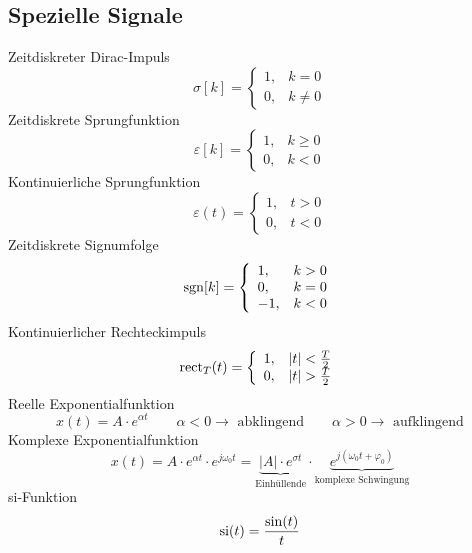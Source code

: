 \documentclass[a4paper, 10pt, fleqn]{article}
\begin{document}
\subsection{Spezielle Signale}
Zeitdiskreter Dirac-Impuls
\[
\sigma[k] = \left\{
    \begin{array}{ll}
        1, & k = 0 \\
        0, & k \neq 0
    \end{array}
\right.
\]
Zeitdiskrete Sprungfunktion
\[
\varepsilon[k] = \left\{
    \begin{array}{ll}
        1, & k \geq 0 \\
        0, & k < 0
    \end{array}
\right.
\]
Kontinuierliche Sprungfunktion
\[
\varepsilon(t) = \left\{
    \begin{array}{ll}
        1, & t > 0 \\
        0, & t < 0
    \end{array}
\right.
\]
Zeitdiskrete Signumfolge
\[
\operatorname{sgn}[k] = \left\{
    \begin{array}{ll}
        1,  & k > 0 \\
        0,  & k = 0 \\
        -1, & k < 0
    \end{array}
\right.
\]
Kontinuierlicher Rechteckimpuls
\[
\operatorname{rect}_T(t) = \left\{
    \begin{array}{ll}
        1, & |t| < \frac{T}{2} \\
        0, & |t| > \frac{T}{2}
    \end{array}
\right.
\]
Reelle Exponentialfunktion
\[ x(t) = A \cdot e^{\alpha t} \qquad \alpha < 0 \to \text{ abklingend} \qquad \alpha > 0 \to \text{ aufklingend} \]
Komplexe Exponentialfunktion
\[ x(t) = A \cdot e^{\alpha t} \cdot e^{j \omega_0 t} = \underbrace{|A| \cdot e^{\sigma t}}_{\text{Einhüllende}} \cdot \underbrace{e^{j(\omega_0 t + \varphi_0)}}_{\text{komplexe Schwingung}} \]
si-Funktion
\[ \operatorname{si}(t) = \frac{\sin(t)}{t} \]
\end{document}
